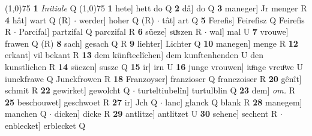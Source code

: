 \documentclass[8pt,a4paper,notitlepage]{article}
\begin{document}
\begin{table}[ht]
\begin{minipage}[t]{0.5\linewidth}
\line(1,0){75} \newline
\textbf{1} \textit{Initiale} Q  \newline
\line(1,0){75} \newline
\textbf{1} hete] hett do Q \textbf{2} dâ] do Q \textbf{3} maneger] Jr menger R \textbf{4} hât] wart Q (R)  $\cdot$ werder] hoher Q (R)  $\cdot$ tât] art Q \textbf{5} Ferefis] Feirefisz Q Feirefis R  $\cdot$ Parcifal] partzifal Q parczifal R \textbf{6} süeze] suͯszen R  $\cdot$ wal] mal U \textbf{7} vrouwe] frawen Q (R) \textbf{8} sach] gesach Q R \textbf{9} liehter] Lichter Q \textbf{10} manegen] menge R \textbf{12} erkant] vil bekant R \textbf{13} dem künfteclîchen] dem kunftenhenden U den kunstlichen R \textbf{14} süezen] susze Q \textbf{15} ir] irn U \textbf{16} junge vrouwen] iuͦnge vreuͦwe U iunckfrawe Q Junckfrowen R \textbf{18} Franzoyser] franzioser Q franczoiser R \textbf{20} gênît] schmit R \textbf{22} gewirket] gewolcht Q  $\cdot$ turteltiubelîn] turtulblin Q \textbf{23} dem] \textit{om.} R \textbf{25} beschouwet] geschwoet R \textbf{27} ir] Jch Q  $\cdot$ lanc] glanck Q blank R \textbf{28} manegem] manchen Q  $\cdot$ dicken] dicke R \textbf{29} antlitze] antlitzet U \textbf{30} sehene] sechent R  $\cdot$ enblecket] erblecket Q \newline
\end{minipage}
\end{table}
\end{document}

